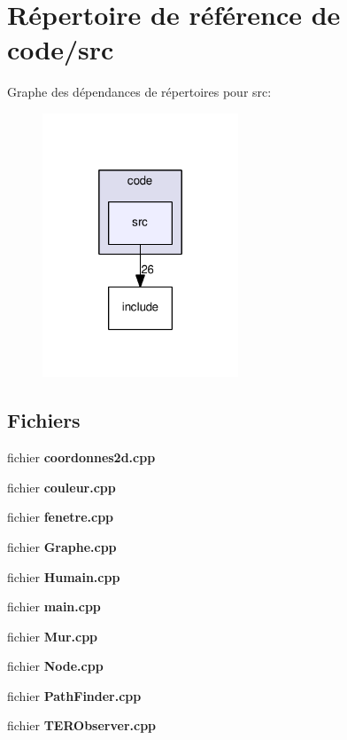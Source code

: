 \section{Répertoire de référence de code/src}
\label{dir_14807827589b339a04434892d1c1deae}
Graphe des dépendances de répertoires pour src\-:
\nopagebreak
\begin{figure}[H]
\begin{center}
\leavevmode
\includegraphics[width=166pt]{dir_14807827589b339a04434892d1c1deae_dep}
\end{center}
\end{figure}
\subsection*{Fichiers}
\begin{DoxyCompactItemize}
\item 
fichier {\bfseries coordonnes2d.\-cpp}
\item 
fichier {\bfseries couleur.\-cpp}
\item 
fichier {\bfseries fenetre.\-cpp}
\item 
fichier {\bfseries Graphe.\-cpp}
\item 
fichier {\bfseries Humain.\-cpp}
\item 
fichier {\bfseries main.\-cpp}
\item 
fichier {\bfseries Mur.\-cpp}
\item 
fichier {\bfseries Node.\-cpp}
\item 
fichier {\bfseries Path\-Finder.\-cpp}
\item 
fichier {\bfseries T\-E\-R\-Observer.\-cpp}
\end{DoxyCompactItemize}
